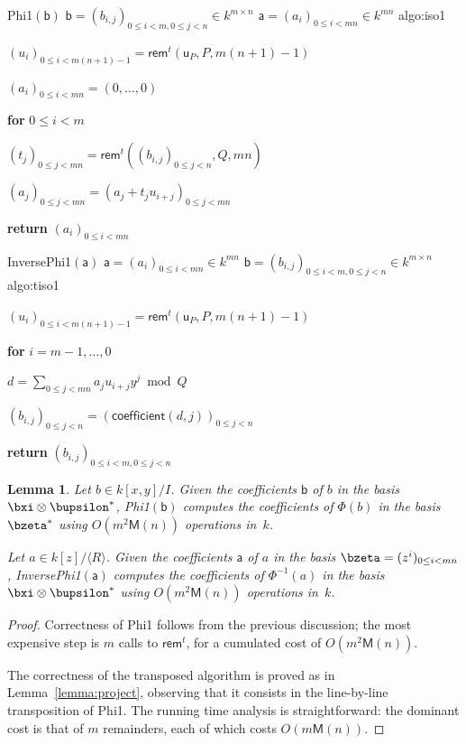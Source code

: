 \documentclass{sig-alternate}
\def\M {\ensuremath{\mathsf{M}}}
\def\va {\ensuremath{\mathsf{a}}}
\def\vu {\ensuremath{\mathsf{u}}}
\def\vb {\ensuremath{\mathsf{b}}}
\def\rem {\ensuremath{\mathsf{rem}}}
\def\coeff {\ensuremath{\mathsf{coefficient}}}
\newcounter{algo}
\newenvironment{algorithm_noendline}[4]{\small\begin{center}\begin{minipage}{0.48\textwidth}
      \refstepcounter{algo}
      \label{#4}
      \sf
      \rule{\textwidth}{0.2pt}\\
      \makebox[\textwidth][c]{Algorithm~\arabic{algo}:~\textbf{#1}}\\
      \rule[0.5\baselineskip]{\textwidth}{0.2pt}\\

      \vspace{-12pt}

      \parbox{\textwidth}{\textbf{Input} #2}
      \parbox{\textwidth}{\textbf{Output} #3}

\vspace{-7pt}

      \begin{enumerate*}}{\end{enumerate*}
      \vspace{-11pt}
\end{minipage}\end{center}
}
\newenvironment{algorithm_endline}[4]{\small\begin{center}\begin{minipage}{0.48\textwidth}
      \refstepcounter{algo}
      \label{#4}
      \sf
      \rule{\textwidth}{0.2pt}\\
      \makebox[\textwidth][c]{Algorithm~\arabic{algo}:~\textbf{#1}}\\
      \rule[0.5\baselineskip]{\textwidth}{0.2pt}\\

      \vspace{-12pt}

      \parbox{\textwidth}{\textbf{Input} #2}
      \parbox{\textwidth}{\textbf{Output} #3}

\vspace{-7pt}

      \begin{enumerate*}}{\end{enumerate*}
      \vspace{-11pt}
      \rule{\textwidth}{0.2pt}
\end{minipage}\end{center}
}
\newcommand{\ang}[1]{\langle#1\rangle}
\newtheorem{Lemma}{Lemma}
\begin{document}
\begin{algofloat}[t]
  \begin{algorithm_noendline}
{Phi1$(\vb)$}
{$\vb = (b_{i,j})_{0 \le i < m, 0 \le j < n} \in k^{m \times n}$}
{$\va = (a_{i})_{0 \le i < mn} \in k^{m n}$}
{algo:iso1}
\item $(u_i)_{0\le i < m(n+1)-1} = \rem^t(\vu_P,P,m(n+1)-1)$
\item  $(a_i)_{0\le i < mn} = (0,\dots,0)$
\item {\bf for} {$0\le i < m$}
\item \hspace{7mm} $(t_j)_{0\le j < mn} = \rem^t( (b_{i,j})_{0 \le j <n},Q,mn)$
\item \hspace{7mm} $(a_j)_{0\le j < mn} = (a_j + t_ju_{i+j})_{0\le j < mn}$
\item {\bf return} $(a_i)_{0\le i <mn}$
  \end{algorithm_noendline}
\begin{algorithm_endline}
{InversePhi1$(\va)$}
{$\va = (a_{i})_{0 \le i < mn} \in k^{m n}$}
{$\vb = (b_{i,j})_{0 \le i < m, 0 \le j < n} \in k^{m \times n}$}
{algo:tiso1}
\item $(u_i)_{0\le i < m(n+1)-1} = \rem^t(\vu_P,P,m(n+1)-1)$
\item {\bf for} {$i = m-1,\dots,0$}
\item \hspace{7mm} $d=\sum_{0 \le j < mn} a_j u_{i+j} y^j \bmod Q$
\item \hspace{7mm}  $(b_{i,j})_{0 \le j < n} = (\coeff(d,j))_{0 \le j < n}$
\item {\bf return} $(b_{i,j})_{0 \le i < m, 0 \le j < n}$
\end{algorithm_endline}
\vspace{-4ex}
\end{algofloat}

\begin{Lemma}
  Let $b \in k[x,y]/I$. Given the coefficients $\vb$ of $b$ in the
  basis $\bxi \otimes \bupsilon^\ast$, {\sf Phi1}$(\vb)$ computes the
  coefficients of $\Phi(b)$ in the basis $\bzeta^\ast$ using
  $O(m^2\M(n))$ operations in~$k$.

   Let $a\in k[z]/\ang{R}$. Given the coefficients $\va$ of $a$ in the
  basis $\bzeta=(z^i)_{0 \le i < mn}$, {\sf InversePhi1}$(\va)$
  computes the coefficients of $\Phi^{-1}(a)$ in the basis $\bxi
  \otimes \bupsilon^\ast$ using $O(m^2\M(n))$ operations in~$k$.
\end{Lemma}
\begin{proof}
  Correctness of {\sf Phi1} follows from the previous discussion; the
  most expensive step is $m$ calls to $\rem^t$, for a cumulated cost
  of $O(m^2\M(n))$.

  The correctness of the transposed algorithm is proved as in
  Lemma~\ref{lemma:project}, observing that it consists in the
  line-by-line transposition of {\sf Phi1}. The running time analysis
  is straightforward: the dominant cost is that of $m$ remainders,
  each of which costs $O(m\M(n))$.
\end{proof}
\end{document}

